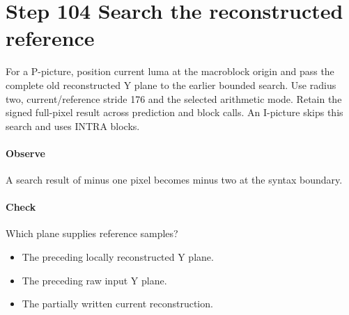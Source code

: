 \section{Step 104 Search the reconstructed reference}\label{h263-picture-s04}
For a P-picture, position current luma at the macroblock origin and pass the
complete old reconstructed Y plane to the earlier bounded search. Use radius two,
current/reference stride 176 and the selected arithmetic mode. Retain the signed
full-pixel result across prediction and block calls. An I-picture skips this
search and uses INTRA blocks.

\paragraph{Observe} A search result of minus one pixel becomes minus two at the syntax boundary.
\paragraph{Check} Which plane supplies reference samples?
\begin{itemize}
  \item[A.] The preceding locally reconstructed Y plane.
  \item[B.] The preceding raw input Y plane.
  \item[C.] The partially written current reconstruction.
\end{itemize}
